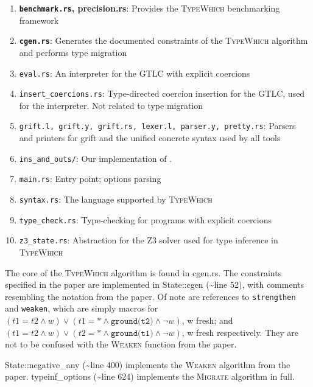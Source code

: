 \documentclass{book}
\newcommand{\system}{\textsc{TypeWhich}\xspace}
\begin{document}
\begin{enumerate}
    \item \textbf{\texttt{benchmark.rs}, precision.rs}: Provides the \system benchmarking
    framework
    \item \textbf{\texttt{cgen.rs}}: Generates the documented constraints of the \system
    algorithm and performs type migration
    \item \texttt{eval.rs}: An interpreter for the GTLC with explicit coercions
    \item \texttt{insert\_coercions.rs}: Type-directed coercion insertion for the GTLC,
    used for the interpreter. Not related to type migration
    \item \texttt{grift.l, grift.y, grift.rs, lexer.l, parser.y, pretty.rs}: Parsers and
    printers for grift and the unified concrete syntax used by all tools
    \item \texttt{ins\_and\_outs/}: Our implementation of \citet{rastogi:gti}.
    \item \texttt{main.rs}: Entry point; options parsing
    \item \texttt{syntax.rs}: The language supported by \system
    \item \texttt{type\_check.rs}: Type-checking for programs with explicit coercions
    \item \texttt{z3\_state.rs}: Abstraction for the Z3 solver used for type inference
    in \system
\end{enumerate}

The core of the \system algorithm is found in cgen.rs. The constraints
specified in the paper are implemented in State::cgen (\textasciitilde{}line 52), with
comments resembling the notation from the paper. Of note are references to
\texttt{strengthen} and \texttt{weaken}, which are simply macros for
$(t1 = t2 \land w) \lor (t1 = * \land \texttt{ground(t2)} \land \neg w)$, w fresh; and
$(t1 = t2 \land w) \lor (t2 = * \land \texttt{ground(t1)} \land \neg w)$, w fresh
respectively. They are not to be confused with the \textsc{Weaken} function
from the paper.

State::negative\_any (\textasciitilde{}line 400) implements the \textsc{Weaken} algorithm from the paper.
typeinf\_options (\textasciitilde{}line 624) implements the \textsc{Migrate} algorithm in full.


\end{document}

